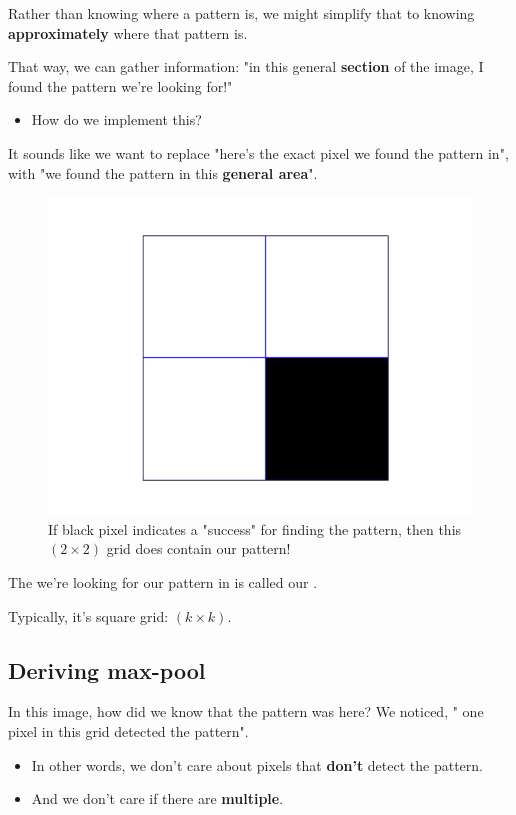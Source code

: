         Rather than knowing  where a pattern is, we might simplify that to knowing \textbf{approximately} where that pattern is.

        That way, we can gather information: "in this general \textbf{section} of the image, I found the pattern we're looking for!"

        \begin{itemize}
            \item How do we implement this?
        \end{itemize}

        It sounds like we want to replace "here's the exact pixel we found the pattern in", with "we found the pattern in this \textbf{general area}".

        \begin{figure}[H]
            \centering
            \includegraphics[width=.3\textwidth]{images/convolutional_neural_networks_images/maxpool_success.png}
            
            \caption*{If black pixel indicates a "success" for finding the pattern, then this $(2 \times 2)$ grid does contain our pattern!}
        \end{figure}

        \begin{definition}
            The  we're looking for our pattern in is called our .

            Typically, it's square grid: $(k \times k)$.
        \end{definition}

    \subsection{Deriving max-pool}

        In this image, how did we know that the pattern was here? We noticed, " one pixel in this grid detected the pattern".

        \begin{itemize}
            \item In other words, we don't care about pixels that \textbf{don't} detect the pattern.
            \item And we don't care if there are \textbf{multiple}.
        \end{itemize}

